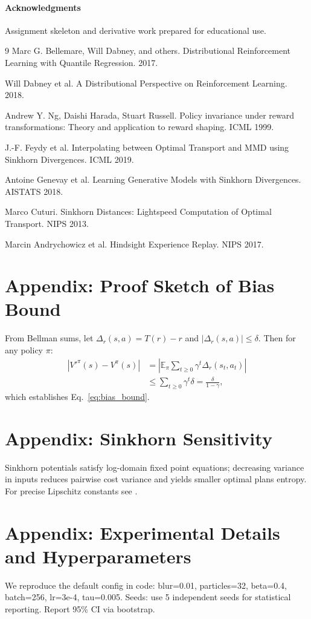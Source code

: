 \documentclass[10pt,twocolumn]{article}
\begin{document}
\paragraph{Acknowledgments}
Assignment skeleton and derivative work prepared for educational use.


\begin{thebibliography}{9}
Marc G. Bellemare, Will Dabney, and others.
Distributional Reinforcement Learning with Quantile Regression. 2017.

Will Dabney et al. A Distributional Perspective on Reinforcement Learning. 2018.

Andrew Y. Ng, Daishi Harada, Stuart Russell. Policy invariance under reward transformations: Theory and application to reward shaping. ICML 1999.

J.-F. Feydy et al. Interpolating between Optimal Transport and MMD using Sinkhorn Divergences. ICML 2019.

Antoine Genevay et al. Learning Generative Models with Sinkhorn Divergences. AISTATS 2018.

Marco Cuturi. Sinkhorn Distances: Lightspeed Computation of Optimal Transport. NIPS 2013.

Marcin Andrychowicz et al. Hindsight Experience Replay. NIPS 2017.

\end{thebibliography}

\appendix
\section{Appendix: Proof Sketch of Bias Bound}
From Bellman sums, let $\Delta_r(s,a)=T(r)-r$ and $|\Delta_r(s,a)|\le\delta$. Then for any policy $\pi$:
\begin{align}
|V'^\pi(s)-V^\pi(s)| &= \left|\mathbb{E}_\pi\sum_{t\ge0}\gamma^t \Delta_r(s_t,a_t)\right|\nonumber\\
&\le \sum_{t\ge0}\gamma^t \delta = \frac{\delta}{1-\gamma},
\end{align}
which establishes Eq.~\ref{eq:bias_bound}.

\section{Appendix: Sinkhorn Sensitivity}
Sinkhorn potentials satisfy log-domain fixed point equations; decreasing variance in inputs reduces pairwise cost variance and yields smaller optimal plans entropy. For precise Lipschitz constants see \cite{feydy2019interpolating}.

\section{Appendix: Experimental Details and Hyperparameters}
We reproduce the default config in code: blur=0.01, particles=32, beta=0.4, batch=256, lr=3e-4, tau=0.005. Seeds: use 5 independent seeds for statistical reporting. Report 95\% CI via bootstrap.
\end{document}
